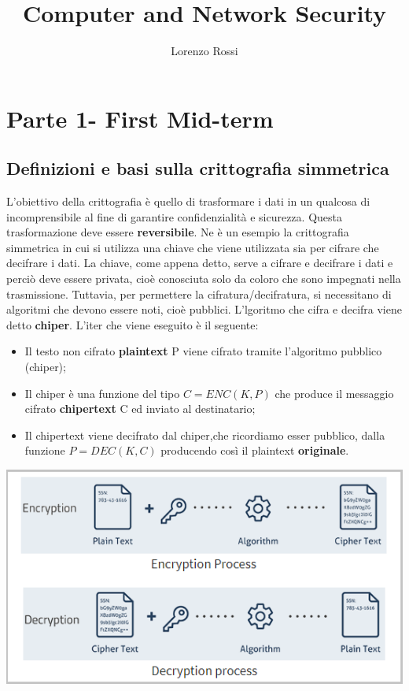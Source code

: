 \documentclass{book}
\title{Computer and Network Security}
\author{Lorenzo Rossi}
\theoremstyle{remark}
\begin{document}
\theoremstyle{definition}

\maketitle

\tableofcontents
\newpage
\part{Parte 1- First Mid-term}
\chapter{Definizioni e basi sulla crittografia simmetrica} L'obiettivo della crittografia è quello di trasformare i dati in un qualcosa di incomprensibile al fine di garantire confidenzialità e sicurezza\@. Questa trasformazione deve essere \textbf{reversibile}\@. Ne è un esempio la crittografia simmetrica in cui si utilizza una chiave che viene utilizzata sia per cifrare che decifrare i dati\@.
La chiave, come appena detto, serve a cifrare e decifrare i dati e perciò deve essere privata, cioè conosciuta solo da coloro che sono impegnati nella trasmissione\@. Tuttavia, per permettere la cifratura/decifratura, si necessitano di algoritmi che devono essere noti, cioè pubblici\@.
L'lgoritmo che cifra e decifra viene detto \textbf{chiper}\@. L'iter che viene eseguito è il seguente:
\begin{itemize}
	\item Il testo non cifrato \textbf{plaintext} P viene cifrato tramite l'algoritmo pubblico (chiper);\@
	\item Il chiper è una funzione del tipo \(C=ENC(K,P)\) che produce il messaggio cifrato \textbf{chipertext} C ed inviato al destinatario;\@
	\item Il chipertext viene decifrato dal chiper,che ricordiamo esser pubblico, dalla funzione \(P=DEC(K,C)\) producendo così il plaintext \textbf{originale}.
\end{itemize}
\begin{center}
	\includegraphics[scale=0.4]{encryption-decryption-diffrences}
\end{center}
\end{document}
